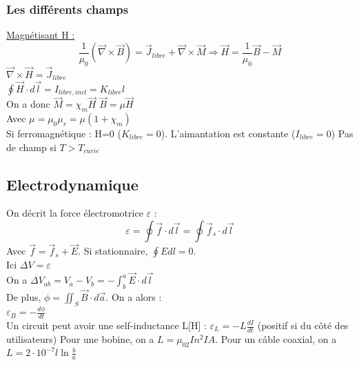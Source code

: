\documentclass[../main.tex]{subfiles}
\begin{document}
\subsubsection{Les différents champs}
\quad \underline{Magnétisant H :}\\
\begin{equation}
    \frac{1}{\mu_0} (\vec{\nabla} \times \vec{B}) = \vec{J}_{libre} + \vec{\nabla} \times \vec{M} \Rightarrow \vec{H} = \frac{1}{\mu_0} \vec{B} - \vec{M}
\end{equation}
$\vec{\nabla} \times \vec{H} = \vec{J}_{libre}$\\
$\oint \vec{H}\cdot d\vec{l} = I_{libre,incl} = K_{libre}l$\\

On a donc $\vec{M} = \chi_m \vec{H}$ $\vec{B} = \mu \vec{H}$\\
Avec $\mu = \mu_0 \mu_r = \mu (1+\chi_m)$\\

\warning Si ferromagnétique : H=0 ($K_{libre}=0$). L'aimantation est constante ($I_{libre} = 0$) Pas de champ si $T>T_{curie}$\\


\subsection{Electrodynamique}
On décrit la force électromotrice $\varepsilon$ : \\
\begin{equation}
    \varepsilon = \oint \vec{f}\cdot d\vec{l} = \oint \vec{f}_s \cdot d\vec{l}
\end{equation}
Avec $\vec{f} = \vec{f}_s + \vec{E}$. Si stationnaire, $\oint Edl = 0$.\\

\warning Ici $\Delta V = \varepsilon$\\

On a $\Delta V_{ab} = V_a - V_b = -\int_b^a \vec{E}\cdot d\vec{l}$\\
De plus, $\phi = \iint_S \vec{B}\cdot d\vec{a}$. On a alors :\\
$\varepsilon_B = -\frac{d\phi}{dt}$\\

Un circuit peut avoir une self-inductance L[H] : $\varepsilon_L = -L\frac{dI}{dt}$ (positif si du côté des utilisateurs) \color{gray} Pour une bobine, on a $L = \mu_02 I n^2IA$. Pour un câble coaxial, on a $L = 2\cdot 10^{-7}l \ln{\frac{b}{a}}$ \color{black}\\
\end{document}
